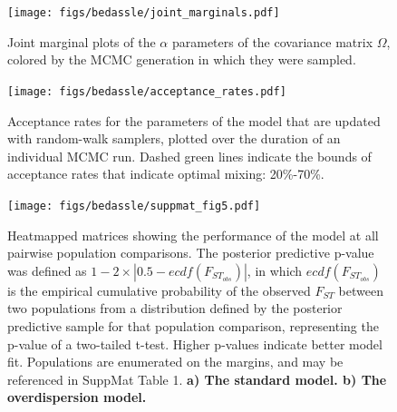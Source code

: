 \begin{figure}[ht!]
\begin{center}
  \texttt{[image: figs/bedassle/joint\_marginals.pdf]}
 \caption{
 		\textmd{Joint marginal plots of the $\alpha$ parameters of the covariance matrix $\Omega$, colored by the MCMC  generation in which they were sampled.}
 \label{sfig:joint_marginals}
  }
\end{center}
\end{figure}

\begin{figure}[ht!]
\begin{center}
  \texttt{[image: figs/bedassle/acceptance\_rates.pdf]}
 \caption{
 		\textmd{Acceptance rates for the parameters of the model that are updated with random-walk samplers, plotted over the duration of an individual MCMC run.  Dashed green lines indicate the bounds of acceptance rates that indicate optimal mixing: 20\%-70\%.}
 \label{sfig:acceptance_rates}
  }
\end{center}
\end{figure}


\begin{figure}[ht!]
\begin{center}
  \texttt{[image: figs/bedassle/suppmat\_fig5.pdf]}
 \caption{
		\textmd{Heatmapped matrices showing the performance of the model at all pairwise population comparisons.  The posterior predictive p-value was defined as 
		$1-2 \times |0.5-ecdf(F_{ST_{obs}})|$, in which $ecdf(F_{ST_{obs}})$ is the empirical cumulative probability of the observed $F_{ST}$ between two populations from a distribution defined by the posterior predictive sample for that population comparison, representing the p-value of a two-tailed t-test.  Higher p-values indicate better model fit.  Populations are enumerated on the margins, and may be referenced in SuppMat Table 1.}
	\bf{a)}
 		\textmd{The standard model.}
	\bf{b)}
 		\textmd{The overdispersion model.}
 \label{sfig:zea.pps.pval}
  }
\end{center}
\end{figure}

